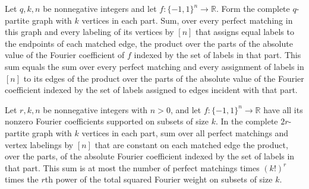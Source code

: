 \begin{theorem}
\label{FABL.sum_matchingLabelingFourierWeight_eq_edgeAssignment}
\leanok
{}
Let $q,k,n$ be nonnegative integers and let $f:\{-1,1\}^n\to\mathbb R$. Form the
complete $q$-partite graph with $k$ vertices in each part. Sum, over every perfect
matching in this graph and every labeling of its vertices by $[n]$ that assigns equal
labels to the endpoints of each matched edge, the product over the parts of the absolute
value of the Fourier coefficient of $f$ indexed by the set of labels in that part. This
sum equals the sum over every perfect matching and every assignment of labels in $[n]$
to its edges of the product over the parts of the absolute value of the Fourier
coefficient indexed by the set of labels assigned to edges incident with that part.
\end{theorem}

\begin{theorem}
\label{FABL.sum_matchingLabelingFourierWeight_le}
\leanok
{}
Let $r,k,n$ be nonnegative integers with $n>0$, and let $f:\{-1,1\}^n\to\mathbb R$ have
all its nonzero Fourier coefficients supported on subsets of size $k$. In the complete
$2r$-partite graph with $k$ vertices in each part, sum over all perfect matchings and
vertex labelings by $[n]$ that are constant on each matched edge the product, over the
parts, of the absolute Fourier coefficient indexed by the set of labels in that part.
This sum is at most the number of perfect matchings times $(k!)^r$ times the $r$th power
of the total squared Fourier weight on subsets of size $k$.
\end{theorem}

